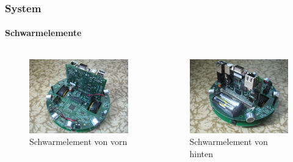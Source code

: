 \documentclass{beamer}
\begin{document}
\begin{frame}
	\frametitle{System}\framesubtitle{Schwarmelemente}
	\begin{columns}
		\begin{column}{0.5\textwidth}
			\begin{figure}
				\centering
				\includegraphics[width=\textwidth]{bilder/robo1.jpg}
				\caption{Schwarmelement von vorn}
			\end{figure}
		\end{column}
		\begin{column}{0.5\textwidth}
			\begin{figure}
				\centering
				\includegraphics[width=\textwidth]{bilder/robo2.jpg}
				\caption{Schwarmelement von hinten}
			\end{figure}
		\end{column}
	\end{columns}
\end{frame}
\end{document}
